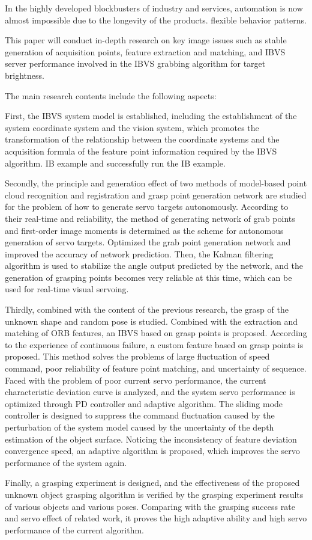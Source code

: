\begin{eabstract}
   In the highly developed blockbusters of industry and services, automation is now almost impossible due to the longevity of the products. flexible behavior patterns.


This paper will conduct in-depth research on key image issues such as stable generation of acquisition points, feature extraction and matching, and IBVS server performance involved in the IBVS grabbing algorithm for target brightness.


The main research contents include the following aspects:


First, the IBVS system model is established, including the establishment of the system coordinate system and the vision system, which promotes the transformation of the relationship between the coordinate systems and the acquisition formula of the feature point information required by the IBVS algorithm. IB example and successfully run the IB example.


Secondly, the principle and generation effect of two methods of model-based point cloud recognition and registration and grasp point generation network are studied for the problem of how to generate servo targets autonomously. According to their real-time and reliability, the method of generating network of grab points and first-order image moments is determined as the scheme for autonomous generation of servo targets. Optimized the grab point generation network and improved the accuracy of network prediction. Then, the Kalman filtering algorithm is used to stabilize the angle output predicted by the network, and the generation of grasping points becomes very reliable at this time, which can be used for real-time visual servoing.


Thirdly, combined with the content of the previous research, the grasp of the unknown shape and random pose is studied. Combined with the extraction and matching of ORB features, an IBVS based on grasp points is proposed. According to the experience of continuous failure, a custom feature based on grasp points is proposed. This method solves the problems of large fluctuation of speed command, poor reliability of feature point matching, and uncertainty of sequence. Faced with the problem of poor current servo performance, the current characteristic deviation curve is analyzed, and the system servo performance is optimized through PD controller and adaptive algorithm. The sliding mode controller is designed to suppress the command fluctuation caused by the perturbation of the system model caused by the uncertainty of the depth estimation of the object surface. Noticing the inconsistency of feature deviation convergence speed, an adaptive algorithm is proposed, which improves the servo performance of the system again.


Finally, a grasping experiment is designed, and the effectiveness of the proposed unknown object grasping algorithm is verified by the grasping experiment results of various objects and various poses. Comparing with the grasping success rate and servo effect of related work, it proves the high adaptive ability and high servo performance of the current algorithm.
\end{eabstract}
